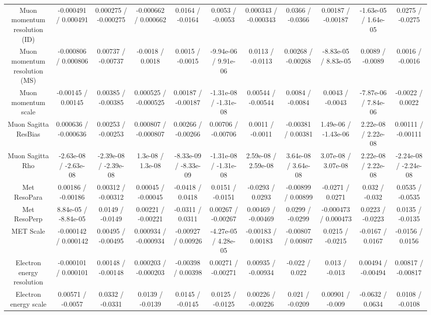 \begin{table}[htbp]
\begin{center}
\begin{tabular}{|c|c|c|c|c|c|c|c|c|c|c|}
  Muon momentum resolution (ID) & -0.000491 / 0.000491 & 0.000275 / -0.000275 & -0.000662 / 0.000662 & 0.0164 / -0.0164 & 0.0053 / -0.0053 & 0.000343 / -0.000343 & 0.0366 / -0.0366 & 0.00187 / -0.00187 & -1.63e-05 / 1.64e-05 & 0.0275 / -0.0275 \\ 
  Muon momentum resolution (MS) & -0.000806 / 0.000806 & 0.00737 / -0.00737 & -0.0018 / 0.0018 & 0.0015 / -0.0015 & -9.94e-06 / 9.91e-06 & 0.0113 / -0.0113 & 0.00268 / -0.00268 & -8.83e-05 / 8.83e-05 & 0.0089 / -0.0089 & 0.0016 / -0.0016 \\ 
  Muon momentum scale & -0.00145 / 0.00145 & 0.00385 / -0.00385 & 0.000525 / -0.000525 & 0.00187 / -0.00187 & -1.31e-08 / -1.31e-08 & 0.00544 / -0.00544 & 0.0084 / -0.0084 & 0.0043 / -0.0043 & -7.87e-06 / 7.84e-06 & -0.0022 / 0.0022 \\ 
  Muon Sagitta ResBias & 0.000636 / -0.000636 & 0.00253 / -0.00253 & 0.000807 / -0.000807 & 0.00266 / -0.00266 & 0.00706 / -0.00706 & 0.0011 / -0.0011 & -0.00381 / 0.00381 & 1.49e-06 / -1.43e-06 & 2.22e-08 / 2.22e-08 & 0.00111 / -0.00111 \\ 
  Muon Sagitta Rho & -2.63e-08 / -2.63e-08 & -2.39e-08 / -2.39e-08 & 1.3e-08 / 1.3e-08 & -8.33e-09 / -8.33e-09 & -1.31e-08 / -1.31e-08 & 2.59e-08 / 2.59e-08 & 3.64e-08 / 3.64e-08 & 3.07e-08 / 3.07e-08 & 2.22e-08 / 2.22e-08 & -2.24e-08 / -2.24e-08 \\ 
  Met ResoPara & 0.00186 / -0.00186 & 0.00312 / -0.00312 & 0.00045 / -0.00045 & -0.0418 / 0.0418 & 0.0151 / -0.0151 & -0.0293 / 0.0293 & -0.00899 / 0.00899 & -0.0271 / 0.0271 & 0.032 / -0.032 & 0.0535 / -0.0535 \\ 
  Met ResoPerp & 8.84e-05 / -8.84e-05 & 0.0149 / -0.0149 & 0.00221 / -0.00221 & -0.0311 / 0.0311 & 0.00267 / -0.00267 & 0.00469 / -0.00469 & 0.0299 / -0.0299 & -0.000473 / 0.000473 & 0.0223 / -0.0223 & 0.0135 / -0.0135 \\ 
  MET Scale & -0.000142 / 0.000142 & 0.00495 / -0.00495 & 0.000934 / -0.000934 & -0.00927 / 0.00926 & -4.27e-05 / 4.28e-05 & -0.00183 / 0.00183 & -0.00807 / 0.00807 & 0.0215 / -0.0215 & -0.0167 / 0.0167 & -0.0156 / 0.0156 \\ 
  Electron energy resolution & -0.000101 / 0.000101 & 0.00148 / -0.00148 & 0.000203 / -0.000203 & -0.00398 / 0.00398 & 0.00271 / -0.00271 & 0.00935 / -0.00934 & -0.022 / 0.022 & 0.013 / -0.013 & 0.00494 / -0.00494 & 0.00817 / -0.00817 \\ 
  Electron energy scale & 0.00571 / -0.0057 & 0.0332 / -0.0331 & 0.0139 / -0.0139 & 0.0145 / -0.0145 & 0.0125 / -0.0125 & 0.00226 / -0.00226 & 0.021 / -0.0209 & 0.00901 / -0.009 & -0.0632 / 0.0634 & 0.0108 / -0.0108 \\ 

\end{tabular}
\end{center}
\end{table}
